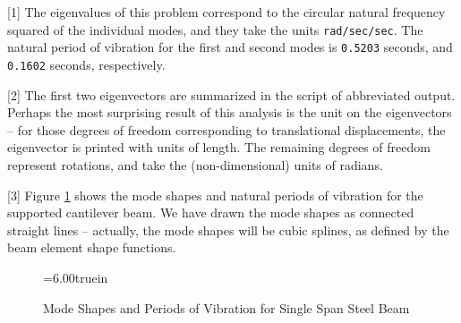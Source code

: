 \begin{description}
\item{[1]}
The eigenvalues of this problem correspond to the circular natural
frequency squared of the individual modes,
and they take the units {\tt rad/sec/sec}.
The natural period of vibration for the first and second modes
is {\tt 0.5203} seconds, and {\tt 0.1602} seconds, respectively.
\item{[2]}
The first two eigenvectors are summarized in the script of abbreviated output.
Perhaps the most surprising result of this analysis is the unit on the
eigenvectors -- for those degrees of freedom corresponding to
translational displacements, the eigenvector is printed with units of length.
The remaining degrees of freedom represent rotations,
and take the (non-dimensional) units of radians.
\item{[3]}
Figure \ref{fig:elastic-beam-mode-shape} shows the mode shapes
and natural periods of vibration for the supported cantilever beam.
We have drawn the mode shapes as connected straight lines -- actually,
the mode shapes will be cubic splines, as defined by the
beam element shape functions.
\end{description}

\vspace{0.15 in}
\begin{figure} [t]
\epsfxsize=6.00truein
\centerline{}
\caption{Mode Shapes and Periods of Vibration for Single Span Steel Beam}
\label{fig:elastic-beam-mode-shape}
\end{figure}

